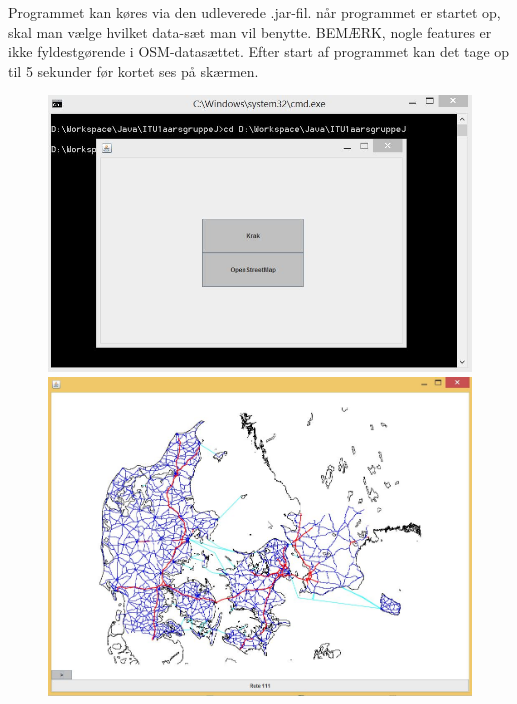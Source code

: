 Programmet kan køres via den udleverede .jar-fil. når programmet er startet op, skal man vælge hvilket data-sæt man vil benytte. BEMÆRK, nogle features er ikke fyldestgørende i OSM-datasættet.
Efter start af programmet kan det tage op til 5 sekunder før kortet ses på skærmen.

\begin{figure}
\centering
\begin{minipage}{.5\textwidth}
  \centering
	\includegraphics[width=(\textwidth)/2]{brugervejledning/vaelgdata}
  \end{minipage}%
\begin{minipage}{.5\textwidth}
  \centering
\includegraphics[width=(\textwidth)/2]{brugervejledning/renkort}
\end{minipage}
\end{figure}


